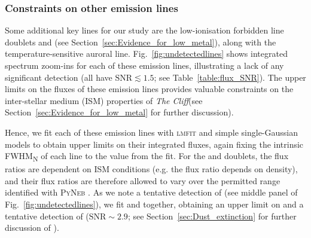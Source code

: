\documentclass[fleqn,usenatbib]{mnras}
\newcommand{\Hbeta}{\text{H\textbeta}\xspace}
\newcommand{\Hgamma}{\text{H\textgamma}\xspace}
\newcommand{\OIIall}{\forbiddenEL[O][ii][\textlambda][\textlambda][3727,][3729]}
\newcommand{\SIIall}{\forbiddenEL[S][ii][\textlambda][\textlambda][6716,][6731]}
\newcommand{\cliff}{\textit{The Cliff}\xspace}
\begin{document}
\subsubsection{Constraints on other emission lines}\label{sec:Fitting_other_lines}

Some additional key lines for our study are the low-ionisation forbidden line doublets \OIIall and \SIIall (see Section~\ref{sec:Evidence_for_low_metal}), along with the temperature-sensitive auroral \OIIIL[4363] line. 
Fig.~\ref{fig:undetectedlines} shows integrated spectrum zoom-ins for each of these emission lines, illustrating a lack of any significant detection (all have $\mathrm{SNR} \lesssim 1.5$; see Table~\ref{table:flux_SNR}). 
The upper limits on the fluxes of these emission lines provides valuable constraints on the inter-stellar medium (ISM) properties of \cliff (see Section~\ref{sec:Evidence_for_low_metal} for further discussion). 

Hence, we fit each of these emission lines with \textsc{lmfit} \citep{Newville2016_LMFIT} and simple single-Gaussian models to obtain upper limits on their integrated fluxes, again fixing the intrinsic FWHM\textsubscript{N} of each line to the value from the \Hbeta fit. 
For the \OIIall and \SIIall doublets, the flux ratios are dependent on ISM conditions (e.g. the \OIIall flux ratio depends on density), and their flux ratios are therefore allowed to vary over the permitted range identified with \textsc{PyNeb} \citep{Luridiana2015_PyNeb}. 
As we note a tentative detection of \Hgamma (see middle panel of Fig.~\ref{fig:undetectedlines}), we fit \Hgamma and \OIIIL[4363] together, obtaining an upper limit on \OIIIL[4363] and a tentative detection of \Hgamma ($\mathrm{SNR}\sim2.9$; see Section~\ref{sec:Dust_extinction} for further discussion of \Hgamma).
\end{document}
